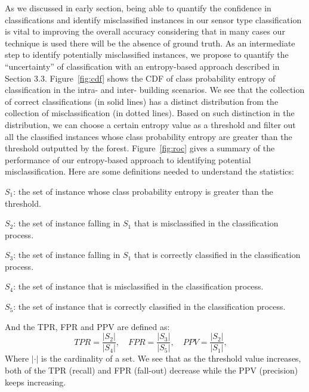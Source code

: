 As we discussed in early section, being able to quantify the confidence in classifications and identify misclassified instances in our sensor type classification is vital to improving 
the overall accuracy considering that in many cases our technique is used there will be the absence of ground truth. As an intermediate step to identify potentially misclassified instances, 
we propose to quantify the ``uncertainty'' of classification with an entropy-based approach described in Section 3.3. Figure~\ref{fig:cdf} shows the CDF of class probability entropy of 
classification in the intra- and inter- building scenarios. We see that the collection of correct classifications (in solid lines) has a distinct distribution from the collection of 
misclassification (in dotted lines). Based on such distinction in the distribution, we can choose a certain entropy value as a threshold and filter out all the classified instances whose 
class probability entropy are greater than the threshold outputted by the forest. Figure~\ref{fig:roc} gives a summary of the performance of our entropy-based approach to 
identifying potential misclassification. Here are some definitions needed to understand the statistics:

$S_{1}$: the set of instance whose class probability entropy is greater than the threshold.

$S_{2}$: the set of instance falling in $S_{1}$ that is misclassified in the classification process.

$S_{3}$: the set of instance falling in $S_{1}$ that is correctly classified in the classification process.

$S_{4}$: the set of instance that is misclassified in the classification process.

$S_{5}$: the set of instance that is correctly classified in the classification process.

And the TPR, FPR and PPV are defined as: 
\begin{displaymath}
TPR = \frac{|S_{2}|}{|S_{4}|},\quad
FPR = \frac{|S_{3}|}{|S_{5}|},\quad
PPV = \frac{|S_{2}|}{|S_{1}|},\quad
\end{displaymath}
Where $|\cdot|$ is the cardinality of a set. We see that as the threshold value increases, both of the TPR (recall) and FPR (fall-out) decrease while the PPV (precision) keeps increasing. 

